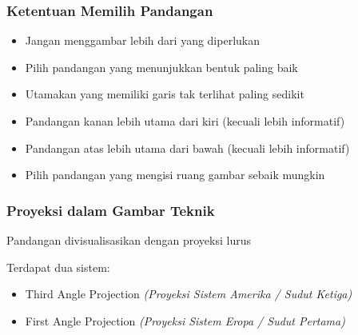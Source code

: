 \documentclass[../gbr_teknik.tex]{subfiles}
\begin{document}
\begin{frame}[mytitle=center,t,mycolor=digiPH_purple,dark]\frametitle{Ketentuan Memilih Pandangan}

	\begin{itemize}
		\item Jangan menggambar lebih dari yang diperlukan
		\item Pilih pandangan yang menunjukkan bentuk paling baik
		\item Utamakan yang memiliki garis tak terlihat paling sedikit
		\item Pandangan kanan lebih utama dari kiri (kecuali lebih informatif)
		\item Pandangan atas lebih utama dari bawah (kecuali lebih informatif)
		\item Pilih pandangan yang mengisi ruang gambar sebaik mungkin
	\end{itemize}
\end{frame}


\begin{frame}[mytitle=standard,t,mycolor=digiPH_gray,light]\frametitle{Proyeksi dalam Gambar Teknik}

	Pandangan divisualisasikan dengan proyeksi lurus

	Terdapat dua sistem:

	\begin{itemize}
		\item Third Angle Projection \textit{(Proyeksi Sistem Amerika / Sudut Ketiga)}
		\item First Angle Projection \textit{(Proyeksi Sistem Eropa / Sudut Pertama)}
	\end{itemize}\end{frame}
\end{document}
